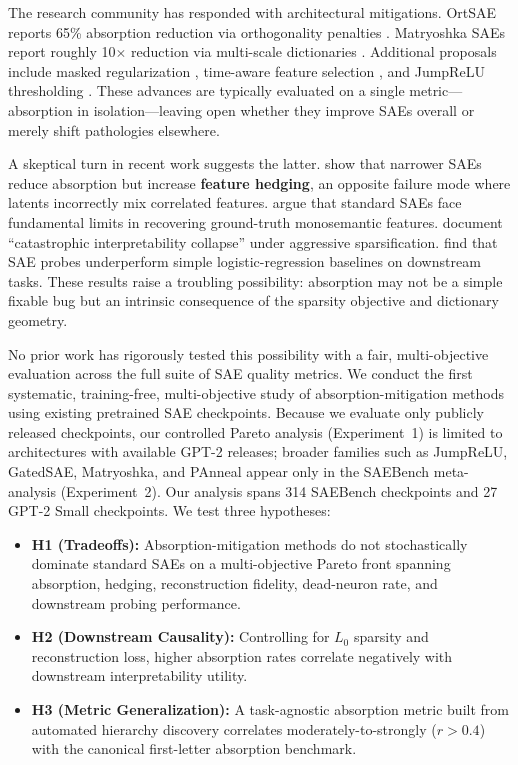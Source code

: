 \documentclass{article}
\begin{document}
The research community has responded with architectural mitigations. OrtSAE reports 65\% absorption reduction via orthogonality penalties \citep{korznikov2025ortsae}. Matryoshka SAEs report roughly 10$\times$ reduction via multi-scale dictionaries \citep{bussmann2025matryoshka}. Additional proposals include masked regularization \citep{narayanaswamy2026masked}, time-aware feature selection \citep{liren2025timeaware}, and JumpReLU thresholding \citep{rajamanoharan2024jumprelu}. These advances are typically evaluated on a single metric---absorption in isolation---leaving open whether they improve SAEs overall or merely shift pathologies elsewhere.

A skeptical turn in recent work suggests the latter. \citet{chanin2025hedging} show that narrower SAEs reduce absorption but increase \textbf{feature hedging}, an opposite failure mode where latents incorrectly mix correlated features. \citet{cui2025monosemantic} argue that standard SAEs face fundamental limits in recovering ground-truth monosemantic features. \citet{roy2026catastrophic} document ``catastrophic interpretability collapse'' under aggressive sparsification. \citet{kantamneni2025probes} find that SAE probes underperform simple logistic-regression baselines on downstream tasks. These results raise a troubling possibility: absorption may not be a simple fixable bug but an intrinsic consequence of the sparsity objective and dictionary geometry.

No prior work has rigorously tested this possibility with a fair, multi-objective evaluation across the full suite of SAE quality metrics. We conduct the first systematic, training-free, multi-objective study of absorption-mitigation methods using existing pretrained SAE checkpoints. Because we evaluate only publicly released checkpoints, our controlled Pareto analysis (Experiment~1) is limited to architectures with available GPT-2 releases; broader families such as JumpReLU, GatedSAE, Matryoshka, and PAnneal appear only in the SAEBench meta-analysis (Experiment~2). Our analysis spans 314 SAEBench checkpoints and 27 GPT-2 Small checkpoints. We test three hypotheses:

\begin{itemize}
    \item \textbf{H1 (Tradeoffs):} Absorption-mitigation methods do not stochastically dominate standard SAEs on a multi-objective Pareto front spanning absorption, hedging, reconstruction fidelity, dead-neuron rate, and downstream probing performance.
    \item \textbf{H2 (Downstream Causality):} Controlling for $L_0$ sparsity and reconstruction loss, higher absorption rates correlate negatively with downstream interpretability utility.
    \item \textbf{H3 (Metric Generalization):} A task-agnostic absorption metric built from automated hierarchy discovery correlates moderately-to-strongly ($r > 0.4$) with the canonical first-letter absorption benchmark.
\end{itemize}
\end{document}
